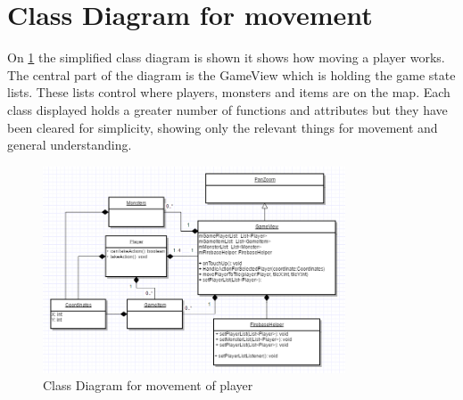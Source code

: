 \section{Class Diagram for movement}

On \ref{ClassDiagramMovement} the simplified class diagram is shown it shows how moving a player works. The central part of the diagram is the GameView which is holding the game state lists. These lists control where players, monsters and items are on the map. Each class displayed holds a greater number of functions and attributes but they have been cleared for simplicity, showing only the relevant things for movement and general understanding.


\begin{figure}
	\centering
	\includegraphics[width=0.8\textwidth]{images/ClassDiagramMovement.PNG}
	\caption{Class Diagram for movement of player \label{ClassDiagramMovement}}
\end{figure}